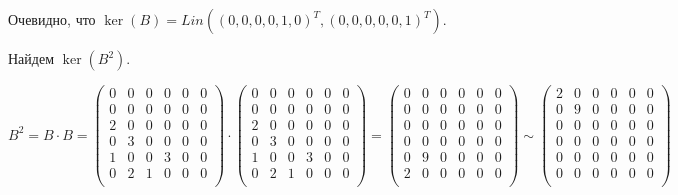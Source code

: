 \documentclass{article}
\newcommand{\lin}{Lin}
\begin{document}
  Очевидно, что $\ker(B) = \lin\left(\left(0, 0, 0, 0, 1, 0\right)^T, \left(0, 0, 0, 0, 0, 1\right)^T\right)$.

  Найдем $\ker(B^2)$.

  \[
    B ^2 = B \cdot B =
    \begin{pmatrix}
      0 & 0 & 0 & 0 & 0 & 0 \\
      0 & 0 & 0 & 0 & 0 & 0 \\
      2 & 0 & 0 & 0 & 0 & 0 \\
      0 & 3 & 0 & 0 & 0 & 0 \\
      1 & 0 & 0 & 3 & 0 & 0 \\
      0 & 2 & 1 & 0 & 0 & 0 \\
    \end{pmatrix}
    \cdot
    \begin{pmatrix}
      0 & 0 & 0 & 0 & 0 & 0 \\
      0 & 0 & 0 & 0 & 0 & 0 \\
      2 & 0 & 0 & 0 & 0 & 0 \\
      0 & 3 & 0 & 0 & 0 & 0 \\
      1 & 0 & 0 & 3 & 0 & 0 \\
      0 & 2 & 1 & 0 & 0 & 0 \\
    \end{pmatrix}
    =
    \begin{pmatrix}
      0 & 0 & 0 & 0 & 0 & 0 \\
      0 & 0 & 0 & 0 & 0 & 0 \\
      0 & 0 & 0 & 0 & 0 & 0 \\
      0 & 0 & 0 & 0 & 0 & 0 \\
      0 & 9 & 0 & 0 & 0 & 0 \\
      2 & 0 & 0 & 0 & 0 & 0 \\
    \end{pmatrix}
    \sim
    \begin{pmatrix}
      2 & 0 & 0 & 0 & 0 & 0 \\
      0 & 9 & 0 & 0 & 0 & 0 \\
      0 & 0 & 0 & 0 & 0 & 0 \\
      0 & 0 & 0 & 0 & 0 & 0 \\
      0 & 0 & 0 & 0 & 0 & 0 \\
      0 & 0 & 0 & 0 & 0 & 0 \\
    \end{pmatrix}
  \]
\end{document}
